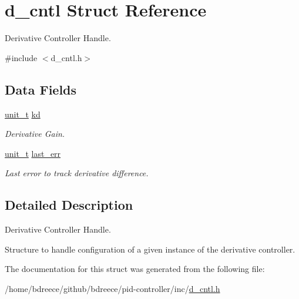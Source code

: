 \hypertarget{structd__cntl}{}\section{d\+\_\+cntl Struct Reference}
\label{structd__cntl}


Derivative Controller Handle.  




{\ttfamily \#include $<$d\+\_\+cntl.\+h$>$}

\subsection*{Data Fields}
\begin{DoxyCompactItemize}
\item 
\mbox{\label{structd__cntl_a86b01e92292450498e055d68966ab615}} 
\hyperlink{pid__conf_8h_a86e89cbe1fee619005bafce52850ab0c}{unit\+\_\+t} \hyperlink{structd__cntl_a86b01e92292450498e055d68966ab615}{kd}
\begin{DoxyCompactList}\small\item\em Derivative Gain. \end{DoxyCompactList}\item 
\mbox{\label{structd__cntl_a75df7d73d46d01fe311cce355db9d8e5}} 
\hyperlink{pid__conf_8h_a86e89cbe1fee619005bafce52850ab0c}{unit\+\_\+t} \hyperlink{structd__cntl_a75df7d73d46d01fe311cce355db9d8e5}{last\+\_\+err}
\begin{DoxyCompactList}\small\item\em Last error to track derivative difference. \end{DoxyCompactList}\end{DoxyCompactItemize}


\subsection{Detailed Description}
Derivative Controller Handle. 

Structure to handle configuration of a given instance of the derivative controller. 

The documentation for this struct was generated from the following file\+:\begin{DoxyCompactItemize}
\item 
/home/bdreece/github/bdreece/pid-\/controller/inc/\hyperlink{d__cntl_8h}{d\+\_\+cntl.\+h}\end{DoxyCompactItemize}
